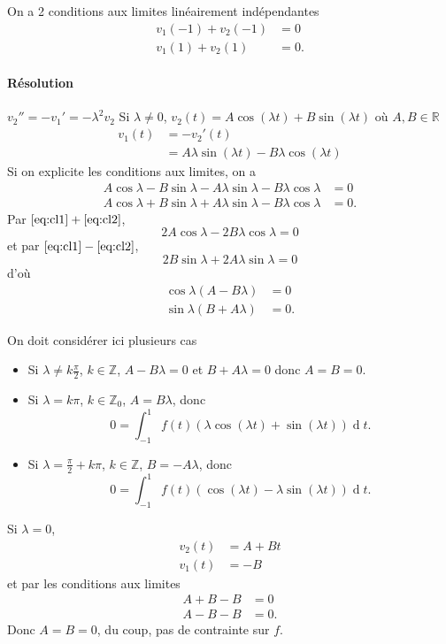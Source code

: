 \documentclass{article}
\DeclareMathOperator{\newdiff}{d} %
\newcommand{\dif}{\newdiff\!}
\begin{document}
\begin{enumerate}
    On a 2 conditions aux limites linéairement indépendantes
    \begin{align*}
      v_1(-1) + v_2(-1) & = 0\\
      v_1(1) + v_2(1) & = 0.
    \end{align*}

    \paragraph{Résolution}
    $v_2'' = -v_1' = -\lambda^2 v_2$
    Si $\lambda \neq 0$,
    $v_2(t) = A \cos(\lambda t) + B\sin(\lambda t)$ où $A, B \in \mathbb{R}$
    \begin{align*}
      v_1(t) & = -v_2'(t)\\
      & = A\lambda\sin(\lambda t) - B\lambda\cos(\lambda t)
    \end{align*}
    Si on explicite les conditions aux limites, on a
    \begin{align}
      \label{eq:cl1}
      A \cos\lambda - B \sin\lambda - A\lambda \sin\lambda - B\lambda\cos\lambda & = 0\\
      \label{eq:cl2}
      A \cos\lambda + B \sin\lambda + A\lambda \sin\lambda - B\lambda\cos\lambda & = 0.
    \end{align}
    Par $\eqref{eq:cl1} + \eqref{eq:cl2}$,
    \[ 2A\cos\lambda - 2B\lambda\cos\lambda = 0 \]
    et par $\eqref{eq:cl1} - \eqref{eq:cl2}$,
    \[ 2B\sin\lambda + 2A\lambda\sin\lambda = 0 \]
    d'où
    \begin{align*}
      \cos\lambda (A - B\lambda) & = 0\\
      \sin\lambda (B + A\lambda) & = 0.
    \end{align*}

    On doit considérer ici plusieurs cas
    \begin{itemize}
      \item Si $\lambda \neq k\frac{\pi}{2}$, $k \in \mathbb{Z}$,
        $A - B\lambda = 0$ et $B + A\lambda = 0$ donc $A = B = 0$.

      \item Si $\lambda = k\pi$, $k \in \mathbb{Z}_0$, $A = B\lambda$,
        donc
        \[ 0 = \int_{-1}^1 f(t) (\lambda \cos(\lambda t) + \sin(\lambda t)) \dif t. \]

      \item Si $\lambda = \frac{\pi}{2} + k\pi$, $k \in \mathbb{Z}$, $B = -A\lambda$,
        donc
        \[ 0 = \int_{-1}^1 f(t) (\cos(\lambda t) - \lambda\sin(\lambda t)) \dif t. \]
    \end{itemize}

    Si $\lambda = 0$,
    \begin{align*}
      v_2(t) & = A + Bt\\
      v_1(t) & = -B
    \end{align*}
    et par les conditions aux limites
    \begin{align*}
      A + B - B & = 0\\
      A - B - B & = 0.
    \end{align*}
    Donc $A = B = 0$, du coup, pas de contrainte sur $f$.
\end{enumerate}
\end{document}
